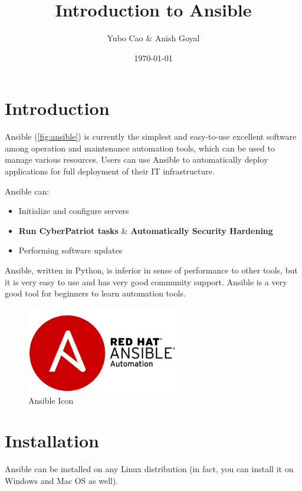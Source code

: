 \documentclass{article}
\title{Introduction to Ansible}
\date{\today}
\author{Yubo Cao \& Anish Goyal}
\begin{document}
\maketitle
\tableofcontents
\newpage

\section{Introduction}

Ansible (\autoref{fig:ansible}) is currently the simplest and easy-to-use
excellent software among operation and maintenance automation tools, which can
be used to manage various resources. Users can use Ansible to automatically
deploy applications for full deployment of their IT infrastructure.

Ansible can:

\begin{itemize}
    \item Initialize and configure servers
    \item \textbf{Run CyberPatriot tasks} \& \textbf{Automatically Security Hardening}
    \item Performing software updates
\end{itemize}

Ansible, written in Python, is inferior in sense of performance to other tools,
but it is very easy to use and has very good community support. Ansible is a
very good tool for beginners to learn automation tools.

\begin{figure}[!htb]
    \centering
    \includegraphics[width=0.6\textwidth]{images/ansible.png}
    \caption{Ansible Icon}\label{fig:ansible}
\end{figure}

\section{Installation}

Ansible can be installed on any Linux distribution (in fact, you can install it on
Windows and Mac OS as well).
\end{document}
